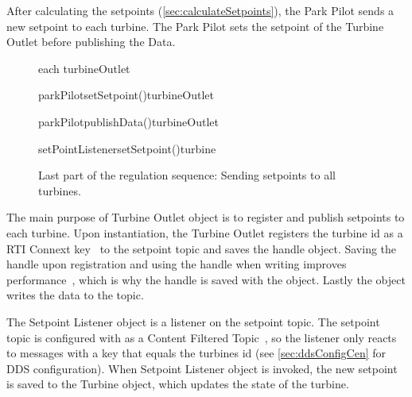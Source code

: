 After calculating the setpoints (\cref{sec:calculateSetpoints}), the Park Pilot sends a new setpoint to each turbine. The Park Pilot sets the setpoint of the Turbine Outlet before publishing the Data.

\begin{figure}
	\centering
	\begin{sequencediagram} %
	
		\begin{sdblock}{each turbineOutlet}{}
			\begin {call}{parkPilot}{setSetpoint()}{turbineOutlet}{}
			\end {call}
			\begin {call}{parkPilot}{publishData()}{turbineOutlet}{}
				\begin {call}{setPointListener}{setSetpoint()}{turbine}{}
				\end {call}
			\end {call}
		\end{sdblock}				
	\end{sequencediagram}

	\caption[Last part of the regulation cycle]{
		\label{fig:sendSetpoints} 
		\footnotesize{%
			Last part of the regulation sequence: Sending setpoints to all turbines.
		}
	}
\end{figure}

The main purpose of Turbine Outlet object is to register and publish setpoints to each turbine. Upon instantiation, the Turbine Outlet registers the turbine id as a RTI Connext key~\cite{rtiConnextUsersManual} to the setpoint topic and saves the handle object. Saving the handle upon registration and using the handle when writing improves performance~\cite{DDSInstanceHandlet}, which is why the handle is saved with the object. Lastly the object writes the data to the topic.

The Setpoint Listener object is a listener on the setpoint topic. The setpoint topic is configured with as a Content Filtered Topic~\cite{rtiConnextUsersManual}, so the listener only reacts to messages with a key that equals the turbines id (see \cref{sec:ddsConfigCen} for DDS configuration). When Setpoint Listener object is invoked, the new setpoint is saved to the Turbine object, which updates the state of the turbine.

